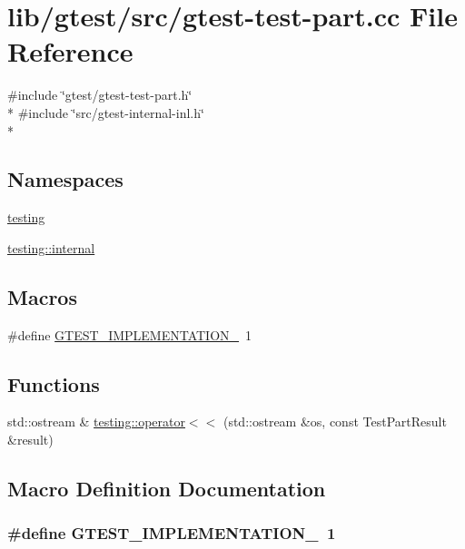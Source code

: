 \hypertarget{gtest-test-part_8cc}{\section{lib/gtest/src/gtest-\/test-\/part.cc File Reference}
\label{gtest-test-part_8cc}
}
{\ttfamily \#include \char`\"{}gtest/gtest-\/test-\/part.\-h\char`\"{}}\\*
{\ttfamily \#include \char`\"{}src/gtest-\/internal-\/inl.\-h\char`\"{}}\\*
\subsection*{Namespaces}
\begin{DoxyCompactItemize}
\item 
\hyperlink{namespacetesting}{testing}
\item 
\hyperlink{namespacetesting_1_1internal}{testing\-::internal}
\end{DoxyCompactItemize}
\subsection*{Macros}
\begin{DoxyCompactItemize}
\item 
\#define \hyperlink{gtest-test-part_8cc_a83bd232fd1077579fada92c31bb7469f}{G\-T\-E\-S\-T\-\_\-\-I\-M\-P\-L\-E\-M\-E\-N\-T\-A\-T\-I\-O\-N\-\_\-}~1
\end{DoxyCompactItemize}
\subsection*{Functions}
\begin{DoxyCompactItemize}
\item 
std\-::ostream \& \hyperlink{namespacetesting_a7c88897836b9f492190fb2b9dfa3a327}{testing\-::operator$<$$<$} (std\-::ostream \&os, const Test\-Part\-Result \&result)
\end{DoxyCompactItemize}


\subsection{Macro Definition Documentation}
\hypertarget{gtest-test-part_8cc_a83bd232fd1077579fada92c31bb7469f}{
\subsubsection[{G\-T\-E\-S\-T\-\_\-\-I\-M\-P\-L\-E\-M\-E\-N\-T\-A\-T\-I\-O\-N\-\_\-}]{\setlength{\rightskip}{0pt plus 5cm}\#define G\-T\-E\-S\-T\-\_\-\-I\-M\-P\-L\-E\-M\-E\-N\-T\-A\-T\-I\-O\-N\-\_\-~1}}\label{gtest-test-part_8cc_a83bd232fd1077579fada92c31bb7469f}
